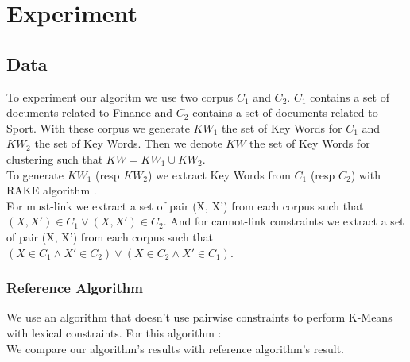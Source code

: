 \section{Experiment}
\subsection{Data}
To experiment our algoritm we use two corpus $C_1$ and $C_2$. $C_1$ contains a
set of documents related to Finance and $C_2$ contains a set of documents
related to Sport. With these corpus we generate $KW_1$ the set of Key Words
for $C_1$ and $KW_2$ the set of Key Words. Then we denote $KW$ the set of Key
Words for clustering such that $KW = KW_1 \cup KW_2$.\\
To generate $KW_1$ (resp $KW_2$) we extract Key Words from $C_1$ (resp $C_2$)
with RAKE algorithm \cite{rake}.\\
For must-link we extract a set of pair (X, X') from  each corpus such that
$(X, X') \in C_1 \vee (X, X') \in C_2$. And for cannot-link constraints we
extract a set of pair (X, X') from  each corpus such that
$(X \in C_1 \wedge  X' \in C_2)\vee (X \in C_2 \wedge  X' \in C_1)$. 
\subsubsection{Reference Algorithm}
We use an algorithm that doesn't use pairwise constraints to perform K-Means
with lexical constraints. For this algorithm : 
\\We compare our algorithm's results with reference algorithm's result.    
